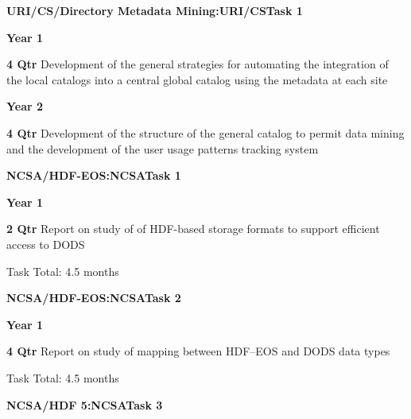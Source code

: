\documentclass[12pt]{article}
\begin{document}
\begin{description}
\begin{description}
   \end{description}
\begin{center}
{\large \bf URI/CS/Directory Metadata Mining:URI/CSTask 1}
\end{center}

 \item{\large \bf Year 1}
   \begin{description}

   \item{\bf 4 Qtr} Development of the general strategies for automating the
     integration of the local catalogs into a central global catalog using
     the metadata at each site

   \end{description}
 \item{\large \bf Year 2}
   \begin{description}

   \item{\bf 4 Qtr} Development of the structure of the general catalog to
     permit data mining and the development of the user usage patterns
     tracking system

   \end{description}
\begin{center}
{\large \bf NCSA/HDF-EOS:NCSATask 1}
\end{center}

 \item{\large \bf Year 1}
   \begin{description}
  
   \item{\bf 2 Qtr} Report on study of of HDF-based storage formats to
     support efficient access to DODS

 Task Total: 4.5 months

   \end{description}
\begin{center}
{\large \bf NCSA/HDF-EOS:NCSATask 2}
\end{center}

 \item{\large \bf Year 1}
   \begin{description}
  
   \item{\bf 4 Qtr} Report on study of mapping between HDF--EOS and DODS data
     types

 Task Total: 4.5 months

   \end{description}
\begin{center}
{\large \bf NCSA/HDF 5:NCSATask 3}
\end{center}


\end{description}
\end{document}
